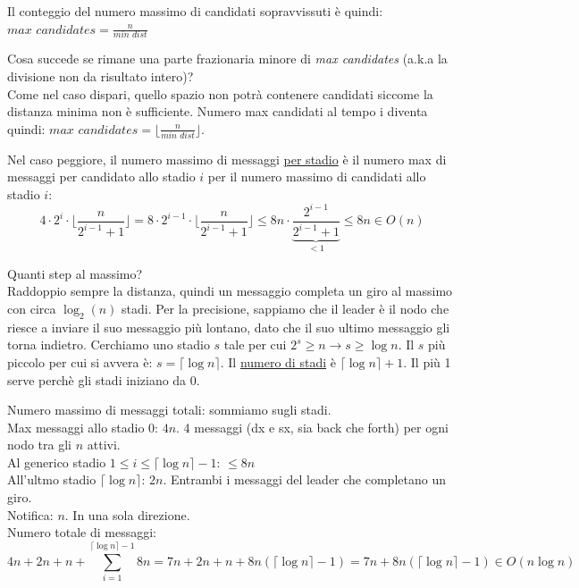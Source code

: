 
Il conteggio del numero massimo di candidati sopravvissuti è quindi: $\textit{max candidates} = \frac{n}{\textit{min dist}}$

Cosa succede se rimane una parte frazionaria minore di \textit{max candidates} (a.k.a la divisione non da risultato intero)? \\
Come nel caso dispari, quello spazio non potrà contenere candidati siccome la distanza minima non è sufficiente.
Numero max candidati al tempo i diventa quindi: $\textit{max candidates} = \lfloor \frac{n}{\textit{min dist}} \rfloor$.


Nel caso peggiore, il numero massimo di messaggi \underline{per stadio} è il numero max di messaggi per candidato allo stadio $i$
per il numero massimo di candidati allo stadio $i$:
$$
4 \cdot 2^i \cdot \lfloor \frac{n}{2^{i-1}+1} \rfloor =
8 \cdot 2^{i-1} \cdot \lfloor \frac{n}{2^{i-1}+1} \rfloor \leq
8n \cdot \underbrace{\frac{2^{i-1}}{2^{i-1}+1}}_{<1} \leq 8n \in O(n)
$$

Quanti step al massimo? \\
Raddoppio sempre la distanza, quindi un messaggio completa un giro al massimo con circa
$\log_2(n)$ stadi.
Per la precisione, sappiamo che il leader è il nodo che riesce a inviare il suo messaggio più lontano, dato che il suo 
ultimo messaggio gli torna indietro. Cerchiamo uno stadio $s$ tale per cui $2^s \geq n \rightarrow s \geq \log n$.
Il $s$ più piccolo per cui si avvera è: $s = \lceil \log n \rceil$.
Il \underline{numero di stadi} è $\lceil \log n \rceil + 1$.
Il più 1 serve perchè gli stadi iniziano da 0.

Numero massimo di messaggi totali: sommiamo sugli stadi. \\
Max messaggi allo stadio 0: $4n$. 4 messaggi (dx e sx, sia back che forth) per ogni nodo tra gli $n$ attivi. \\
Al generico stadio $1 \leq i \leq \lceil \log n \rceil - 1$: $\leq 8n$ \\
All'ultmo stadio $\lceil \log n \rceil$: $2n$. Entrambi i messaggi del leader che completano un giro. \\
Notifica: $n$. In una sola direzione. \\

Numero totale di messaggi:
$$
4n + 2n + n + \sum_{i=1}^{\lceil \log n \rceil - 1} 8n = 7n + 2n + n + 8n (\lceil \log n \rceil - 1) = 7n + 8n (\lceil \log n \rceil - 1) \in O(n \log n)
$$

